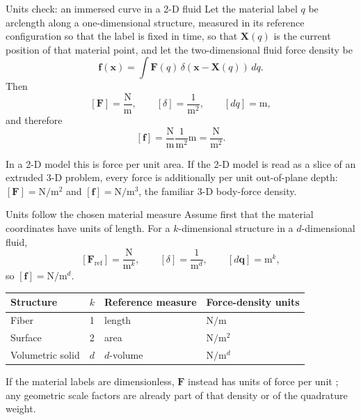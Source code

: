 \documentclass[aspectratio=169,11pt]{beamer}
\newcommand{\xvec}{\bm{x}}
\newcommand{\Xvec}{\bm{q}}
\newcommand{\fvec}{\bm{f}}
\newcommand{\Fvec}{\bm{F}}
\begin{document}
\begin{frame}{Units check: an immersed curve in a 2-D fluid}
Let the material label \(q\) be arclength along a one-dimensional structure, measured in its reference configuration so that the label is fixed in time, so that \(\bm X(q)\) is the current position of that material point, and let the two-dimensional fluid force density be
\[
  \fvec(\xvec)=\int\Fvec(q)\,\delta\!\left(\xvec-\bm X(q)\right)\,dq .
\]
Then
\[
  [\Fvec]=\frac{\mathrm N}{\mathrm m},
  \qquad
  [\delta]=\frac{1}{\mathrm m^2},
  \qquad
  [dq]=\mathrm m,
\]
and therefore
\[
  [\fvec]
  =\frac{\mathrm N}{\mathrm m}\frac{1}{\mathrm m^2}\mathrm m
  =\boxed{\frac{\mathrm N}{\mathrm m^2}}.
\]

\begin{punchbox}
In a 2-D model this is force per unit area. If the 2-D model is read as a slice of an extruded 3-D problem, every force is additionally per unit out-of-plane depth: \([\Fvec]=\mathrm N/\mathrm m^2\) and \([\fvec]=\mathrm N/\mathrm m^3\), the familiar 3-D body-force density.
\end{punchbox}
\end{frame}

\begin{frame}{Units follow the chosen material measure}
Assume first that the material coordinates have units of length. For a \(k\)-dimensional structure in a \(d\)-dimensional fluid,
\[
  [\Fvec_{\mathrm{ref}}]=\frac{\mathrm{N}}{\mathrm{m}^{k}},
  \qquad
  [\delta]=\frac{1}{\mathrm{m}^{d}},
  \qquad
  [d\Xvec]=\mathrm{m}^{k},
\]
so \([\fvec]=\mathrm{N}/\mathrm{m}^{d}\).

\vspace{2pt}
{\centering
\begin{tabular}{@{}llll@{}}
\toprule
Structure & \(k\) & Reference measure & Force-density units \\
\midrule
Fiber & 1 & length & \(\mathrm{N}/\mathrm{m}\) \\
Surface & 2 & area & \(\mathrm{N}/\mathrm{m}^{2}\) \\
Volumetric solid & \(d\) & \(d\)-volume & \(\mathrm{N}/\mathrm{m}^{d}\) \\
\bottomrule
\end{tabular}\par}
\vspace{4pt}
\begin{punchbox}
If the material labels are dimensionless, \(\Fvec\) instead has units of force per unit ; any geometric scale factors are already part of that density or of the quadrature weight.
\end{punchbox}
\end{frame}
\end{document}
